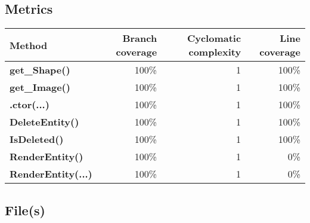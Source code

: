 \documentclass[a4paper,landscape,10pt]{article}
\begin{document}
\subsection{Metrics}
\begin{longtable}[l]{|l|r|r|r|}
\hline
\textbf{Method} & \textbf{Branch coverage} & \textbf{Cyclomatic complexity} & \textbf{Line coverage}\\
\hline
\textbf{get\_Shape()} & 100\% & 1 & 100\%\\
\hline
\textbf{get\_Image()} & 100\% & 1 & 100\%\\
\hline
\textbf{.ctor(...)} & 100\% & 1 & 100\%\\
\hline
\textbf{DeleteEntity()} & 100\% & 1 & 100\%\\
\hline
\textbf{IsDeleted()} & 100\% & 1 & 100\%\\
\hline
\textbf{RenderEntity()} & 100\% & 1 & 0\%\\
\hline
\textbf{RenderEntity(...)} & 100\% & 1 & 0\%\\
\hline
\end{longtable}
\subsection{File(s)}
\end{document}
